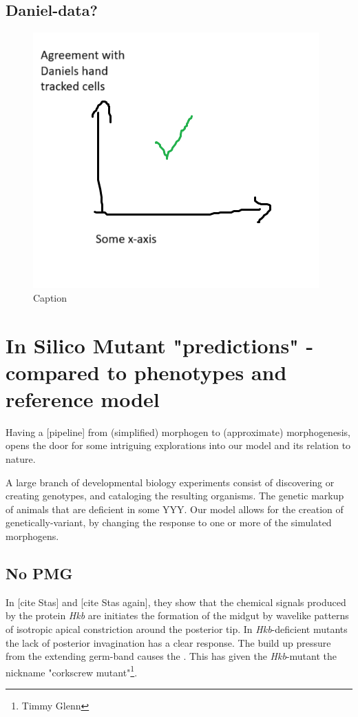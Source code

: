 \subsection{Daniel-data?}
\begin{figure}[H]
    \centering
    \includegraphics[width=0.8\linewidth]{chapters/Results/figures/daniel_placeholder.png}
    \caption{Caption}
    \label{fig:enter-label}
\end{figure}
\newpage
\section{In Silico Mutant "predictions" - compared to phenotypes and reference model}
Having a [pipeline] from (simplified) morphogen to (approximate) morphogenesis, opens the door for some intriguing explorations into our model and its relation to nature.

A large branch of developmental biology experiments consist of discovering or creating genotypes, and cataloging the resulting organisms. The genetic markup of animals that are deficient in some YYY. 
Our model allows for the creation of genetically-variant, by changing the response to one or more of the simulated morphogens.\\


\subsection{No PMG}
In [cite Stas] and [cite Stas again], they show that the chemical signals produced by the protein \textit{Hkb} are initiates the formation of the midgut by wavelike patterns of isotropic apical constriction around the posterior tip. In \textit{Hkb}-deficient mutants the lack of posterior invagination has a clear response. The build up pressure from the extending germ-band causes the . This has given the \textit{Hkb}-mutant the nickname "corkscrew mutant"\footnote{Timmy Glenn}.\\

